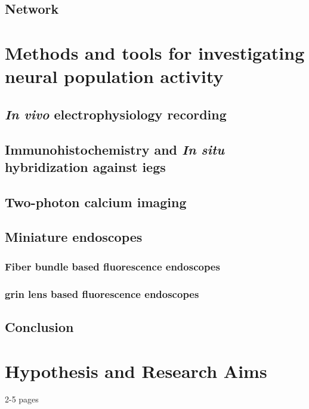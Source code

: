 \subsection{Network}


\section{Methods and tools for investigating neural population activity}
\subsection{\textit{In vivo} electrophysiology recording}
\subsection{Immunohistochemistry and \textit{In situ} hybridization against \glspl{ieg}}
\subsection{Two-photon calcium imaging}
\subsection{Miniature endoscopes}
\subsubsection{Fiber bundle based fluorescence endoscopes}
\subsubsection{\gls{grin} lens based fluorescence endoscopes}
\subsection{Conclusion}


\section{Hypothesis and Research Aims}
2-5 pages
